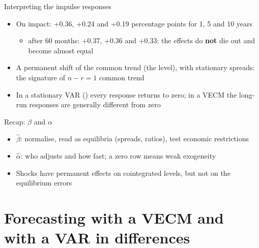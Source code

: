 \begin{frame}{Interpreting the impulse responses}
\itemsize{\small}
\begin{itemize}
    \item On impact: +0.36, +0.24 and +0.19 percentage points for 1, 5 and 10 years
    \begin{itemize}
        \item after 60 months: +0.37, +0.36 and +0.33: the effects do \textbf{not} die out and become almost equal
    \end{itemize}
    \item A permanent shift of the common trend (the level), with stationary spreads: the signature of $n - r = 1$ common trend
    \item In a stationary VAR () every response returns to zero; in a VECM the long-run responses are generally different from zero
\end{itemize}
\end{frame}

\begin{frame}{Recap: $\beta$ and $\alpha$}
\itemsize{\small}
\begin{itemize}
    \item $\hat\beta$: normalise, read as equilibria (spreads, ratios), test economic restrictions
    \item $\hat\alpha$: who adjusts and how fast; a zero row means weak exogeneity
    \item Shocks have permanent effects on cointegrated levels, but not on the equilibrium errors
\end{itemize}
\end{frame}


\section{Forecasting with a VECM and with a VAR in differences}

